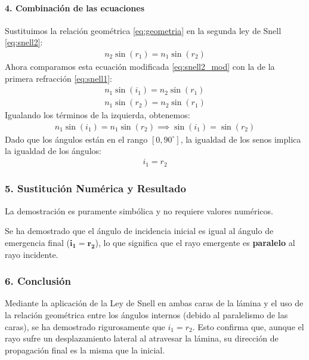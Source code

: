 \paragraph*{4. Combinación de las ecuaciones}
Sustituimos la relación geométrica \eqref{eq:geometria} en la segunda ley de Snell \eqref{eq:snell2}:
\begin{gather}
    n_2 \sin(r_1) = n_1 \sin(r_2) \label{eq:snell2_mod}
\end{gather}
Ahora comparamos esta ecuación modificada \eqref{eq:snell2_mod} con la de la primera refracción \eqref{eq:snell1}:
\begin{gather}
    n_1 \sin(i_1) = n_2 \sin(r_1) \nonumber \\
    n_1 \sin(r_2) = n_2 \sin(r_1) \nonumber
\end{gather}
Igualando los términos de la izquierda, obtenemos:
\begin{gather}
    n_1 \sin(i_1) = n_1 \sin(r_2) \implies \sin(i_1) = \sin(r_2)
\end{gather}
Dado que los ángulos están en el rango $[0, 90^\circ]$, la igualdad de los senos implica la igualdad de los ángulos:
\begin{gather}
    i_1 = r_2
\end{gather}

\subsubsection*{5. Sustitución Numérica y Resultado}
La demostración es puramente simbólica y no requiere valores numéricos.
\begin{cajaresultado}
    Se ha demostrado que el ángulo de incidencia inicial es igual al ángulo de emergencia final ($\boldsymbol{i_1 = r_2}$), lo que significa que el rayo emergente es \textbf{paralelo} al rayo incidente.
\end{cajaresultado}

\subsubsection*{6. Conclusión}
\begin{cajaconclusion}
Mediante la aplicación de la Ley de Snell en ambas caras de la lámina y el uso de la relación geométrica entre los ángulos internos (debido al paralelismo de las caras), se ha demostrado rigurosamente que $i_1 = r_2$. Esto confirma que, aunque el rayo sufre un desplazamiento lateral al atravesar la lámina, su dirección de propagación final es la misma que la inicial.
\end{cajaconclusion}

